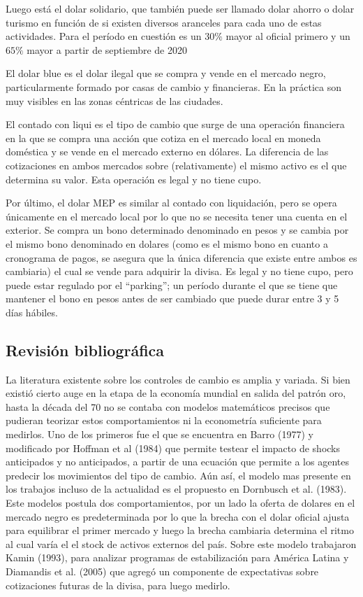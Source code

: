 \documentclass[11pt,a4paper]{article}
\begin{document}
Luego está el dolar solidario, que también puede ser llamado dolar ahorro o dolar turismo en función de si existen diversos aranceles para cada uno de estas actividades. Para el período en cuestión es un $30 \% $ mayor al oficial primero y un $65 \%  $ mayor a partir de septiembre de 2020

El dolar blue es el dolar ilegal que se compra y vende en el mercado negro, particularmente formado por casas de cambio y financieras. En la práctica son muy visibles en las zonas céntricas de las ciudades.

El contado con liqui es el tipo de cambio que surge de una operación financiera en la que se compra una acción que cotiza en el mercado local en moneda doméstica y se vende en el mercado externo en dólares. La diferencia de las cotizaciones en ambos mercados sobre (relativamente) el mismo activo es el que determina su valor. Esta operación es legal y no tiene cupo.

Por último, el dolar MEP es similar al contado con liquidación, pero se opera únicamente en el mercado local por lo que no se necesita tener una cuenta en el exterior. Se compra un bono determinado denominado en pesos y se cambia por el mismo bono denominado en dolares (como es el mismo bono en cuanto a cronograma de pagos, se asegura que la única diferencia que existe entre ambos es cambiaria) el cual se vende para adquirir la divisa. Es legal y no tiene cupo, pero puede estar regulado por el ``parking''; un período durante el que se tiene que mantener el bono en pesos antes de ser cambiado que puede durar entre 3 y 5 días hábiles. 



\subsection{Revisión bibliográfica}
La literatura existente sobre los controles de cambio es amplia y variada. Si bien existió cierto auge en la etapa de la economía mundial en salida del patrón oro, hasta la década del 70 no se contaba con modelos matemáticos precisos que pudieran teorizar estos comportamientos ni la econometría suficiente para medirlos. Uno de los primeros fue el que se encuentra en Barro (1977) y modificado por Hoffman et al (1984) que permite testear el impacto de shocks anticipados y no anticipados, a partir de una ecuación que permite a los agentes predecir los movimientos del tipo de cambio. Aún así, el modelo mas presente en los trabajos incluso de la actualidad es el propuesto en Dornbusch et al. (1983). Este modelos postula dos comportamientos, por un lado la oferta de dolares en el mercado negro es predeterminada por lo que la brecha con el dolar oficial ajusta para equilibrar el primer mercado y luego la brecha cambiaria determina el ritmo al cual varía el el stock de activos externos del país. Sobre este modelo trabajaron Kamin (1993), para analizar programas de estabilización para América Latina y Diamandis et al. (2005) que agregó un componente de expectativas sobre cotizaciones futuras de la divisa, para luego medirlo. 
\end{document}
